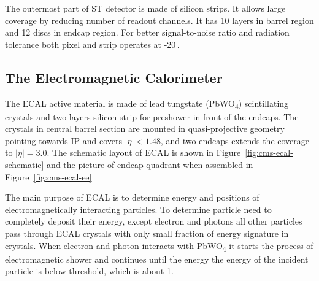 The outermost part of \gls{ST} detector is made of silicon strips. It allows large
coverage by reducing number of readout channels. It has 10 layers in barrel region
and 12 discs in endcap region. For better signal-to-noise ratio and radiation
tolerance both pixel and strip operates at -20\,\de{}\xspace.

\subsection{
  The Electromagnetic Calorimeter
}

The \gls{ECAL} active material is made of lead tungstate (PbWO\textsubscript{4})
scintillating crystals and two layers silicon strip for preshower
in front of the endcaps. The crystals in central barrel section are mounted
in quasi-projective geometry pointing towards \gls{IP} and covers
\( |\eta| < 1.48 \), and two endcaps extends the coverage to
\( |\eta| = 3.0 \). The schematic layout of \gls{ECAL} is shown in Figure~\ref{fig:cms-ecal-schematic}
and the picture of endcap quadrant when assembled in Figure~\ref{fig:cms-ecal-ee}

The main purpose of \gls{ECAL} is to determine energy and positions of
electromagnetically interacting particles. To determine particle need to completely
deposit their energy, except electron and photons all other particles pass
through \gls{ECAL} crystals with only small fraction of energy signature in crystals.
When electron and photon interacts with PbWO\textsubscript{4} it starts the process
of electromagnetic shower and continues until the energy the energy of the incident
particle is below threshold, which is about 1\MeV{}.

